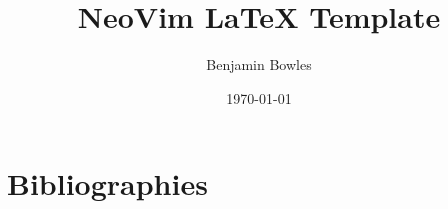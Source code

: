 \documentclass[12pt]{article}
\title{NeoVim LaTeX Template}
\author{Benjamin Bowles}
\date{\today}
\begin{document}
\maketitle
\newpage

\tableofcontents
\newpage

\section{Bibliographies}
\cite{TestBook}
\cite{TestArticle}




\newpage
\end{document}
